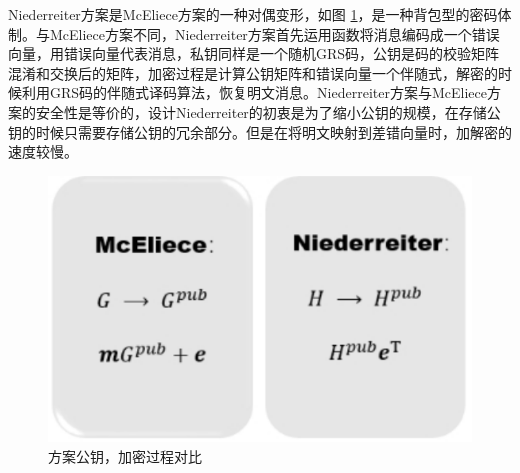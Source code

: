 Niederreiter方案\cite{Niederreiter1986Knapsack}是McEliece方案的一种对偶变形，如图 \ref{fig:comparator_pdf}，是一种背包型的密码体制。与McEliece方案不同，Niederreiter方案首先运用函数将消息编码成一个错误向量，用错误向量代表消息，私钥同样是一个随机GRS码，公钥是码的校验矩阵混淆和交换后的矩阵，加密过程是计算公钥矩阵和错误向量一个伴随式，解密的时候利用GRS码的伴随式译码算法，恢复明文消息。Niederreiter方案与McEliece方案的安全性是等价的\cite{Yuan1994On}，设计Niederreiter的初衷是为了缩小公钥的规模，在存储公钥的时候只需要存储公钥的冗余部分。但是在将明文映射到差错向量时，加解密的速度较慢。

\begin{figure}[H]
	\centering
	\includegraphics{fig/comparator.pdf}
	\caption{方案公钥，加密过程对比} %
	\label{fig:comparator_pdf}
\end{figure}


